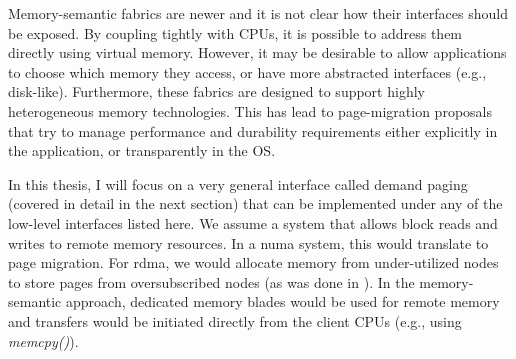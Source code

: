 Memory-semantic fabrics are newer and it is not clear how their interfaces
should be exposed. By coupling tightly with CPUs, it is possible to address
them directly using virtual memory. However, it may be desirable to allow
applications to choose which memory they access, or have more abstracted
interfaces (e.g., disk-like). Furthermore, these fabrics are designed to
support highly heterogeneous memory technologies. This has lead to
page-migration proposals that try to manage performance and durability
requirements either explicitly in the application, or transparently in the
OS\cite{heteros}\cite{mojim}.

In this thesis, I will focus on a very general interface called demand paging
(covered in detail in the next section) that can be implemented under any of
the low-level interfaces listed here. We assume a system that allows block
reads and writes to remote memory resources. In a \gls{numa} system, this would
translate to page migration. For \gls{rdma}, we would allocate memory from
under-utilized nodes to store pages from oversubscribed nodes (as was done in
\cite{infiniswap}). In the memory-semantic approach, dedicated memory blades
would be used for remote memory and transfers would be initiated directly from
the client CPUs (e.g., using \emph{memcpy()}).
